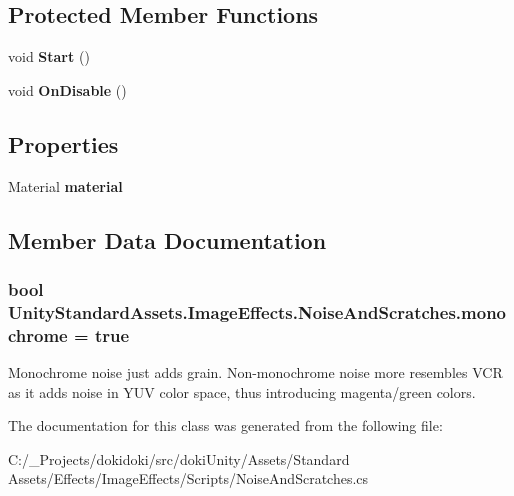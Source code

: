 \subsection*{Protected Member Functions}
\begin{DoxyCompactItemize}
\item 
void {\bfseries Start} ()\hypertarget{class_unity_standard_assets_1_1_image_effects_1_1_noise_and_scratches_a0bb80ca6e82b80b5fbf1b48575887fb7}{}\label{class_unity_standard_assets_1_1_image_effects_1_1_noise_and_scratches_a0bb80ca6e82b80b5fbf1b48575887fb7}

\item 
void {\bfseries On\+Disable} ()\hypertarget{class_unity_standard_assets_1_1_image_effects_1_1_noise_and_scratches_aa5d3399f11b0cf5298ce95c99764ecfb}{}\label{class_unity_standard_assets_1_1_image_effects_1_1_noise_and_scratches_aa5d3399f11b0cf5298ce95c99764ecfb}

\end{DoxyCompactItemize}
\subsection*{Properties}
\begin{DoxyCompactItemize}
\item 
Material {\bfseries material}\hypertarget{class_unity_standard_assets_1_1_image_effects_1_1_noise_and_scratches_a51339988feb1692a15c5e03f57ff0f48}{}\label{class_unity_standard_assets_1_1_image_effects_1_1_noise_and_scratches_a51339988feb1692a15c5e03f57ff0f48}

\end{DoxyCompactItemize}


\subsection{Member Data Documentation}
\subsubsection[{\texorpdfstring{monochrome}{monochrome}}]{\setlength{\rightskip}{0pt plus 5cm}bool Unity\+Standard\+Assets.\+Image\+Effects.\+Noise\+And\+Scratches.\+monochrome = true}\hypertarget{class_unity_standard_assets_1_1_image_effects_1_1_noise_and_scratches_a515c34ae0514bdfe1e371ea784e6b060}{}\label{class_unity_standard_assets_1_1_image_effects_1_1_noise_and_scratches_a515c34ae0514bdfe1e371ea784e6b060}
Monochrome noise just adds grain. Non-\/monochrome noise more resembles V\+CR as it adds noise in Y\+UV color space, thus introducing magenta/green colors. 

The documentation for this class was generated from the following file\+:\begin{DoxyCompactItemize}
\item 
C\+:/\+\_\+\+Projects/dokidoki/src/doki\+Unity/\+Assets/\+Standard Assets/\+Effects/\+Image\+Effects/\+Scripts/Noise\+And\+Scratches.\+cs\end{DoxyCompactItemize}
